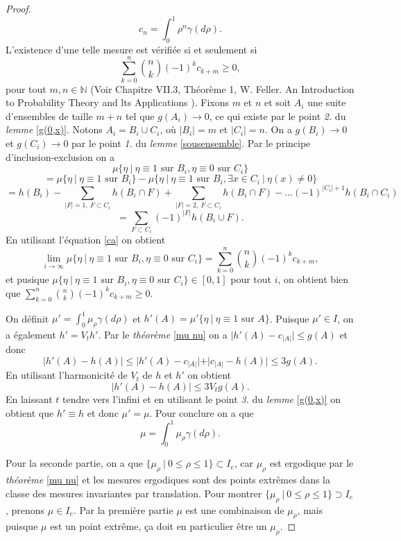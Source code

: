 \documentclass[a4paper,11pt]{article}
\theoremstyle{break}
\theoremstyle{break}
\theoremstyle{definition}
\theoremstyle{remark}
\begin{document}
\begin{proof}
$$
c_n=\int_0^1 \rho^n \gamma (d\rho).
$$
L'existence d'une telle mesure est vérifiée si et seulement si %
$$
\sum\limits_{k=0}^n {n \choose k} (-1)^k c_{k+m}\geq 0,
$$
pour tout $m,n \in \mathbb{N}$ (Voir Chapitre VII.3, Théorème 1, W. Feller. An Introduction to Probability Theory and lts Applications \cite{Feller}). Fixons $m$ et $n$  et soit $A_i$ une suite d'ensembles de taille $m+n$ tel que $g(A_i)\rightarrow 0$, ce qui existe par le point \textit{2.} du \textit{lemme} \ref{g(0,x)}. Notons $A_i=B_i\cup C_i$, où $\vert B_i\vert = m$ et $\vert C_i \vert =n$. On a $g(B_i)\rightarrow 0$ et $g(C_i)\rightarrow 0$ par le point \textit{1.} du \textit{lemme} \ref{sousensemble}. Par le principe d'inclusion-exclusion on a
$$
\mu\{\eta \ \vert \ \eta \equiv 1 \text{ sur } B_i,\eta\equiv 0 \text{ sur } C_i\}
$$
$$
= \mu\{\eta \ \vert \ \eta \equiv 1 \text{ sur } B_i\}-\mu\{\eta \ \vert \ \eta \equiv 1 \text{ sur } B_i,\exists x\in C_i \ \vert \ \eta (x)\neq 0\}
$$
$$
=h(B_i)-\sum\limits_{\vert F\vert =1,\ F\subset C_i}h(B_i \cap F) +\sum\limits_{\vert F\vert =2,\ F\subset C_i}h(B_i \cap F)-...(-1)^{\vert C_i \vert + 1} h(B_i\cap C_i)
$$
$$
=\sum\limits_{F\subset C_i} (-1)^{\vert F\vert} h(B_i \cup F).
$$
En utilisant l'équation \eqref{ca} on obtient
$$
\lim_{i\rightarrow\infty} \mu\{\eta \ \vert \ \eta \equiv 1 \text{ sur } B_i,\eta\equiv 0 \text{ sur } C_i\}=\sum\limits_{k=0}^n {n \choose k} (-1)^k c_{k+m},
$$
et pusique $\mu\{\eta \ \vert \ \eta \equiv 1 \text{ sur } B_i,\eta\equiv 0 \text{ sur } C_i\}\in [0, 1]$ pour tout $i$, on obtient bien que $\sum\limits_{k=0}^n {n \choose k} (-1)^k c_{k+m}\geq 0$.

On définit $\mu'=\int_0^1 \mu_\rho\gamma (d\rho)$ et $h'(A)=\mu'\{\eta\ \vert \ \eta\equiv 1\text{ sur } A\}$. Puisque $\mu'\in I$, on a également $h'=V_th'$. Par le \textit{théorème} \ref{mu nu} on a  $\vert h'(A)-c_{\vert A\vert}\vert \leq g(A)$ et donc
$$
\vert h' (A)- h(A)\vert \leq \vert h' (A)-c_{\vert A\vert} \vert + \vert c_{\vert A\vert}- h(A)\vert \leq 3 g(A).
$$
En utilisant l'harmonicité de $V_t$ de $h$ et $h'$ on obtient
$$
\vert h' (A)- h(A)\vert \leq  3 V_t g(A).
$$
En laissant $t$ tendre vers l'infini et en utilisant le point \textit{3.} du \textit{lemme} \ref{g(0,x)} on obtient que $h'\equiv h$ et donc $\mu ' =\mu$. Pour conclure on a que
$$
\mu =\int_0^1 \mu_\rho \gamma (d\rho).
$$

Pour la seconde partie, on a que $\{\mu_\rho \ \vert \ 0 \leq \rho \leq 1\}\subset I_e$, car $\mu_\rho$ est ergodique par le \textit{théorème} \ref{mu nu} et les mesures ergodiques sont des points extrêmes dans la classe des mesures invariantes par translation. Pour montrer $\{\mu_\rho \ \vert \ 0 \leq \rho \leq 1\}\supset I_e$, prenons $\mu\in I_e$. Par la première partie $\mu$ est une combinaison de $\mu_\rho$, mais puisque $\mu$ est un point extrême, ça doit en particulier être un $\mu_\rho$.
\end{proof}
\end{document}
